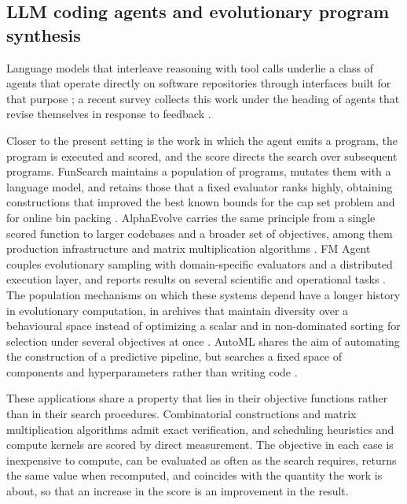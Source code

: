 \subsection{LLM coding agents and evolutionary program synthesis}
\label{sec:related:agents}

Language models that interleave reasoning with tool calls \citep{react2022} underlie a class of
agents that operate directly on software repositories through interfaces built for that purpose
\citep{sweagent2024, openhands2025}; a recent survey collects this work under the heading of agents
that revise themselves in response to feedback \citep{selfevolve2025}.

Closer to the present setting is the work in which the agent emits a program, the program is
executed and scored, and the score directs the search over subsequent programs. FunSearch maintains
a population of programs, mutates them with a language model, and retains those that a fixed
evaluator ranks highly, obtaining constructions that improved the best known bounds for the cap set
problem and for online bin packing \citep{funsearch2023}. AlphaEvolve carries the same principle
from a single scored function to larger codebases and a broader set of objectives, among them
production infrastructure and matrix multiplication algorithms \citep{alphaevolve2025}. FM Agent
couples evolutionary sampling with domain-specific evaluators and a distributed execution layer,
and reports results on several scientific and operational tasks \citep{fmagent2025}. The population
mechanisms on which these systems depend have a longer history in evolutionary computation, in
archives that maintain diversity over a behavioural space instead of optimizing a scalar
\citep{mapelites2015} and in non-dominated sorting for selection under several objectives at once
\citep{nsga2}. AutoML shares the aim of automating the construction of a predictive pipeline, but
searches a fixed space of components and hyperparameters rather than writing code
\citep{autosklearn2}.

These applications share a property that lies in their objective functions rather than in their
search procedures. Combinatorial constructions and matrix multiplication algorithms admit exact
verification, and scheduling heuristics and compute kernels are scored by direct measurement. The
objective in each case is inexpensive to compute, can be evaluated as often as the search requires,
returns the same value when recomputed, and coincides with the quantity the work is about, so that
an increase in the score is an improvement in the result.
